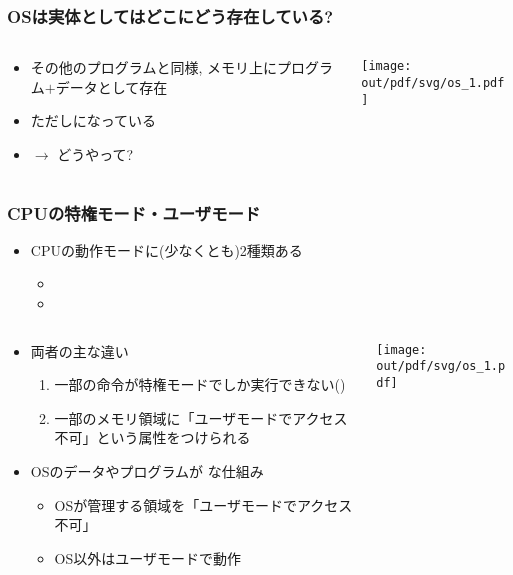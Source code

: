 \documentclass[12pt,dvipdfmx]{beamer}
\begin{document}
\begin{frame}
\frametitle{OSは実体としてはどこにどう存在している?}
  \begin{columns}
    \begin{column}{0.6\textwidth}
      \begin{itemize}
      \item その他のプログラムと同様, メモリ上にプログラム$+$データとして存在
      \item ただしになっている
      \item $\rightarrow$ どうやって?
      \end{itemize}
    \end{column}
    \begin{column}{0.4\textwidth}
      \texttt{[image: out/pdf/svg/os\_1.pdf]}
    \end{column}
  \end{columns}
\end{frame}

\begin{frame}
\frametitle{CPUの特権モード・ユーザモード}
\begin{itemize}
\item CPUの動作モードに(少なくとも)2種類ある
  \begin{itemize}
  \item {}
  \item {}
  \end{itemize}
\end{itemize}
\begin{columns}
  \begin{column}{0.6\textwidth}
    \begin{itemize}
    \item 両者の主な違い
      \begin{enumerate}
      \item 一部の命令が特権モードでしか実行できない()
      \item 一部のメモリ領域に「ユーザモードでアクセス不可」という属性をつけられる
      \end{enumerate}
    \item OSのデータやプログラムが
      な仕組み
      \begin{itemize}
      \item OSが管理する領域を「ユーザモードでアクセス不可」
      \item OS以外はユーザモードで動作
      \end{itemize}
    \end{itemize}
  \end{column}
  \begin{column}{0.4\textwidth}
    \texttt{[image: out/pdf/svg/os\_1.pdf]}
  \end{column}
\end{columns}
\end{frame}
\end{document}
